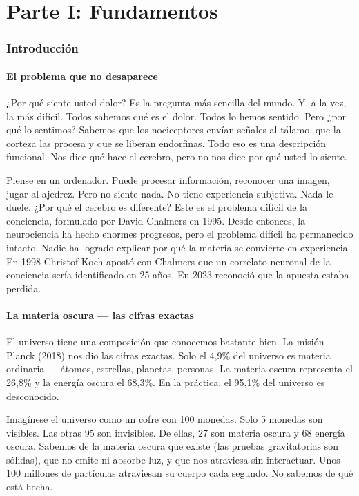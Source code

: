 \documentclass[11pt,a4paper]{article}
\begin{document}
\newpage
\part*{Parte I: Fundamentos}
\section{Introducción}

\subsection{El problema que no desaparece}
¿Por qué siente usted dolor? Es la pregunta más sencilla del mundo. Y, a la vez, la más difícil. Todos sabemos qué es el dolor. Todos lo hemos sentido. Pero ¿por qué lo sentimos? Sabemos que los nociceptores envían señales al tálamo, que la corteza las procesa y que se liberan endorfinas. Todo eso es una descripción funcional. Nos dice qué hace el cerebro, pero no nos dice por qué usted lo siente.

Piense en un ordenador. Puede procesar información, reconocer una imagen, jugar al ajedrez. Pero no siente nada. No tiene experiencia subjetiva. Nada le duele. ¿Por qué el cerebro es diferente? Este es el problema difícil de la conciencia, formulado por David Chalmers en 1995. Desde entonces, la neurociencia ha hecho enormes progresos, pero el problema difícil ha permanecido intacto. Nadie ha logrado explicar por qué la materia se convierte en experiencia. En 1998 Christof Koch apostó con Chalmers que un correlato neuronal de la conciencia sería identificado en 25 años. En 2023 reconoció que la apuesta estaba perdida.

\subsection{La materia oscura --- las cifras exactas}
El universo tiene una composición que conocemos bastante bien. La misión Planck (2018) nos dio las cifras exactas. Solo el 4,9\% del universo es materia ordinaria --- átomos, estrellas, planetas, personas. La materia oscura representa el 26,8\% y la energía oscura el 68,3\%. En la práctica, el 95,1\% del universo es desconocido.

Imagínese el universo como un cofre con 100 monedas. Solo 5 monedas son visibles. Las otras 95 son invisibles. De ellas, 27 son materia oscura y 68 energía oscura. Sabemos de la materia oscura que existe (las pruebas gravitatorias son sólidas), que no emite ni absorbe luz, y que nos atraviesa sin interactuar. Unos 100 millones de partículas atraviesan su cuerpo cada segundo. No sabemos de qué está hecha.
\end{document}
